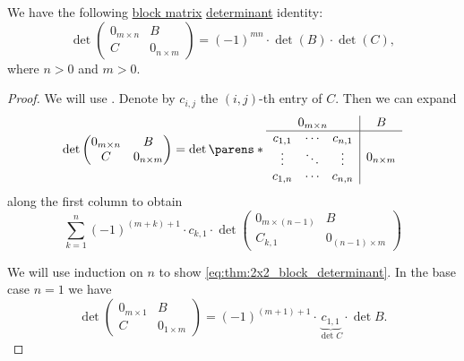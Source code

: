 \begin{lemma}\label{thm:2x2_block_antidiagonal_determinant}
  We have the following \hyperref[def:block_matrix]{block matrix} \hyperref[def:matrix_determinant]{determinant} identity:
  \begin{equation}\label{eq:thm:2x2_block_determinant}
    \det
    \begin{pmatrix}
      0_{m \times n} & B              \\
      C              & 0_{n \times m}
    \end{pmatrix}
    =
    (-1)^{mn} \cdot \det(B) \cdot \det(C),
  \end{equation}
  where \( n > 0 \) and \( m > 0 \).
\end{lemma}
\begin{proof}
  We will use . Denote by \( c_{i,j} \) the \( (i, j) \)-th entry of \( C \). Then we can expand
  \begin{equation*}
    \det
    \begin{pmatrix}
      0_{m \times n} & B              \\
      C              & 0_{n \times m}
    \end{pmatrix}
    =
    \det
    \parens*
      {
        \begin{array}{c | c}
          0_{m \times n} & B              \\
          \hline
          \begin{matrix}
             c_{1,1} & \cdots & c_{n,1} \\
             \vdots  & \ddots & \vdots  \\
             c_{1,n} & \cdots & c_{n,n}
          \end{matrix} & 0_{n \times m}
        \end{array}
      }
  \end{equation*}
  along the first column to obtain
  \begin{equation*}
    \sum_{k=1}^n (-1)^{(m + k) + 1} \cdot c_{k,1} \cdot \det
    \begin{pmatrix}
      0_{m \times (n-1)} & B                  \\
      C_{k,1}            & 0_{(n-1) \times m}
    \end{pmatrix}
  \end{equation*}

  We will use induction on \( n \) to show \eqref{eq:thm:2x2_block_determinant}. In the base case \( n = 1 \) we have
  \begin{equation*}
    \det
    \begin{pmatrix}
      0_{m \times 1} & B              \\
      C              & 0_{1 \times m}
    \end{pmatrix}
    =
    (-1)^{(m + 1) + 1} \cdot \underbrace{c_{1,1}}_{\det C} \cdot \det B.
  \end{equation*}


\end{proof}
